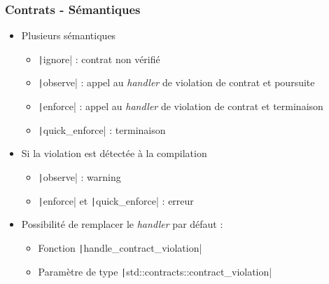 \documentclass[C++.tex]{subfiles}
\begin{document}
\begin{frame}[fragile]
	\frametitle{Contrats - Sémantiques}
	\begin{itemize}
		\item Plusieurs sémantiques
		\begin{itemize}
			\item \texttt|ignore| : contrat non vérifié
			\item \texttt|observe| : appel au \textit{handler} de violation de contrat et poursuite
			\item \texttt|enforce| : appel au \textit{handler} de violation de contrat et terminaison
			\item \texttt|quick_enforce| : terminaison

		\end{itemize}
		\item Si la violation est détectée à la compilation
		\begin{itemize}
			\item \texttt|observe| : warning
			\item \texttt|enforce| et \texttt|quick_enforce| : erreur
		\end{itemize}
		\item Possibilité de remplacer le \textit{handler} par défaut :
		\begin{itemize}
			\item Fonction \texttt|handle_contract_violation|
			\item Paramètre de type \texttt|std::contracts::contract_violation|
		\end{itemize}
	\end{itemize}
\end{frame}
\end{document}
